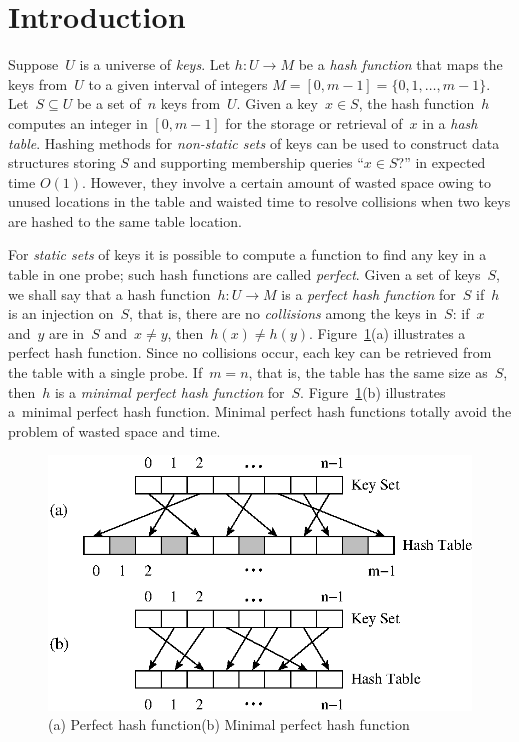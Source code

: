 \section{Introduction}
\label{sec:introduction}

Suppose~$U$ is a universe of \textit{keys}.
Let $h:U\to M$ be a {\em hash function} that maps the keys from~$U$
to a given interval of integers $M=[0,m-1]=\{0,1,\dots,m-1\}$.
Let~$S\subseteq U$ be a set of~$n$ keys from~$U$.
Given a key~$x\in S$, the hash function~$h$ computes an integer in
$[0,m-1]$ for the storage or retrieval of~$x$ in a {\em hash table}.
Hashing methods for {\em non-static sets} of keys can be used to construct
data structures storing $S$ and supporting membership queries
``$x \in S$?'' in expected time $O(1)$.
However, they involve a certain amount of wasted space owing to unused
locations in the table and waisted time to resolve collisions when
two keys are hashed to the same table location.

For {\em static sets} of keys it is possible to compute a function
to find any key in a table in one probe; such hash functions are called
\textit{perfect}. 
Given a set of keys~$S$, we shall say that a hash function~$h:U\to M$ is a
\textit{perfect hash function} for~$S$ if~$h$ is an injection on~$S$,
that is, there are no \textit{collisions} among the keys in~$S$: if~$x$
and~$y$ are in~$S$ and~$x\neq y$, then~$h(x)\neq h(y)$.
Figure~\ref{fig:minimalperfecthash-ph-mph}(a) illustrates a perfect hash
function.
Since no collisions occur, each key can be retrieved from the table
with a single probe.
If~$m=n$, that is, the table has the same size as~$S$,
then~$h$ is a \textit{minimal perfect hash function} for~$S$.
Figure~\ref{fig:minimalperfecthash-ph-mph}(b) illustrates
a~minimal perfect hash function.
Minimal perfect hash functions totally avoid the problem of wasted
space and time.

\begin{figure}
\centering
  \includegraphics{figs/minimalperfecthash-ph-mph.ps}
\caption{(a) Perfect hash function\quad  (b) Minimal perfect hash function}
\label{fig:minimalperfecthash-ph-mph}
\end{figure}


